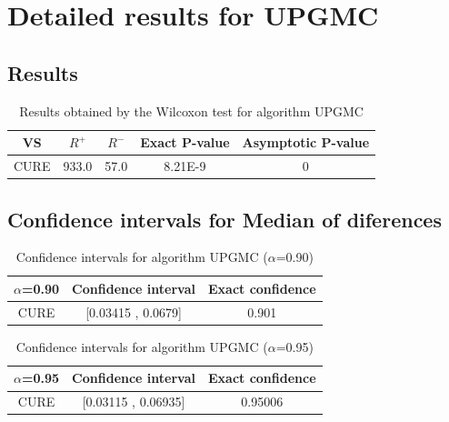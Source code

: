 \documentclass[a4paper,10pt]{article}
\begin{document}
 \clearpage 


\section{Detailed results for UPGMC}


\subsection{Results}

\begin{table}[!htp]
\centering\small
\begin{tabular}{
|c|c|c|c|c|}
\hline
 VS & $R^{+}$ & $R^{-}$ & Exact P-value & Asymptotic P-value \\ \hline 
CURE & 933.0 & 57.0 & 8.21E-9 & 0\\ \hline 

\end{tabular}
\caption{Results obtained by the Wilcoxon test for algorithm UPGMC}
\end{table}

\subsection{Confidence intervals for Median of diferences}

\begin{table}[!htp]
\centering\small
\begin{tabular}{
|c|c|c|}
\hline
 $\alpha$=0.90 & Confidence interval & Exact confidence \\ \hline 
CURE & [0.03415 , 0.0679] & 0.901\\ \hline 

\end{tabular}
\caption{Confidence intervals for algorithm UPGMC ($\alpha$=0.90)}
\end{table}
\begin{table}[!htp]
\centering\small
\begin{tabular}{
|c|c|c|}
\hline
 $\alpha$=0.95 & Confidence interval & Exact confidence \\ \hline 
CURE & [0.03115 , 0.06935] & 0.95006\\ \hline 

\end{tabular}
\caption{Confidence intervals for algorithm UPGMC ($\alpha$=0.95)}
\end{table}

 \clearpage 
\end{document}

